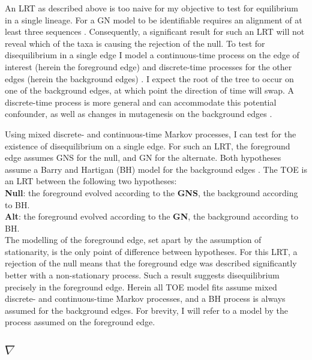 An LRT as described above is too naive for my objective to test for equilibrium in a single lineage. For a GN model to be \gls{identifiable} requires an alignment of at least three sequences \citep{Chang1996FullConsistency}. Consequently, a significant result for such an LRT will not reveal which of the taxa is causing the rejection of the null. To test for disequilibrium in a single \gls{edge} I model a continuous-time process on the edge of interest (herein the foreground edge) and discrete-time processes for the other edges (herein the background edges) \citep{Verbyla2013TheSubstitution}. I expect the root of the tree to occur on one of the background edges, at which point the direction of time will swap. A discrete-time process is more general and can accommodate this potential confounder, as well as changes in mutagenesis on the background edges \citep{Verbyla2013TheSubstitution}. 

Using mixed discrete- and continuous-time Markov processes, I can test for the existence of disequilibrium on a single edge. For such an LRT, the foreground edge assumes GNS for the null, and GN for the alternate. Both hypotheses assume a Barry and Hartigan (BH) model for the background edges \citep{Barry1987StatisticalEvolution}. The TOE is an LRT between the following two hypotheses: \\ \textbf{Null}: the foreground evolved according to the \textbf{GNS}, the background according to BH. \\ \textbf{Alt}: the foreground evolved according to the \textbf{GN}, the background according to BH.\\ The modelling of the foreground edge, set apart by the assumption of stationarity, is the only point of difference between hypotheses. For this LRT, a rejection of the null means that the foreground edge was described significantly better with a non-stationary process. Such a result suggests disequilibrium precisely in the foreground edge. Herein all TOE model fits assume mixed discrete- and continuous-time Markov processes, and a BH process is always assumed for the background edges. For brevity, I will refer to a model by the process assumed on the foreground edge.

\subsection{$\nabla$}
\label{nabla}

